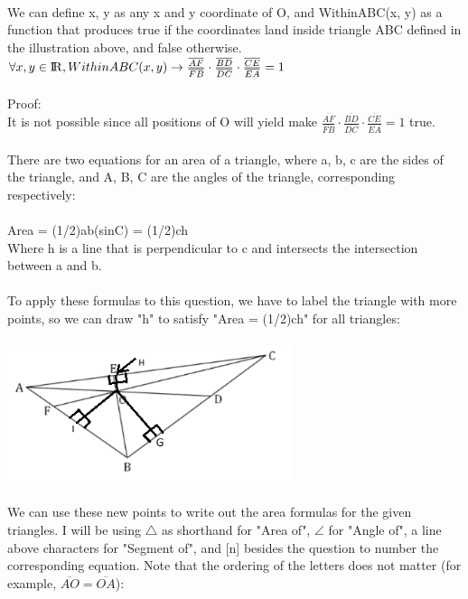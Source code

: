   \begin{Questions}
  \\
  \\
  {\color{NavyBlue}
  \\ We can define x, y as any x and y coordinate of O, and WithinABC(x, y) as a function that produces true if the coordinates land inside triangle ABC defined in the illustration above, and false otherwise.
  \\ $\forall x, y \in \R, WithinABC(x, y) \rightarrow \frac{\overline{AF}}{\overline{FB}}\cdot \frac{\overline{BD}}{\overline{  DC}} \cdot \frac{\overline{  CE}}{\overline{  EA}} = 1$
  \\
  \\Proof:
  \\It is not possible since all positions of O will yield make $\frac{\overline{AF}}{\overline{FB}}\cdot \frac{\overline{BD}}{\overline{  DC}} \cdot \frac{\overline{  CE}}{\overline{  EA}} = 1$ true. 
  \\
  \\There are two equations for an area of a triangle, where a, b, c are the sides of the triangle, and A, B, C are the angles of the triangle, corresponding respectively:
  \\
  \\Area = (1/2)ab(sinC) = (1/2)ch
  \\Where h is a line that is perpendicular to c and intersects the intersection between a and b.
  \\
  \\To apply these formulas to this question, we have to label the triangle with more points, so we can draw "h" to satisfy "Area = (1/2)ch" for all triangles:
  \\
  \\\includegraphics[height=4.0cm]{q4.PNG}
  \\
  \\We can use these new points to write out the area formulas for the given triangles. I will be using $\triangle$ as shorthand for "Area of", $\angle$ for "Angle of", a line above characters for "Segment of", and [n] besides the question to number the corresponding equation. Note that the ordering of the letters does not matter (for example, $\overline{AO} = \overline{OA}$):
}
\end{Questions}
